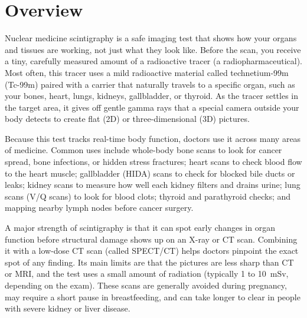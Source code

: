 \label{ch:infographic-nms}

\section{Overview}

Nuclear medicine scintigraphy is a safe imaging test that shows how your organs and tissues are working, not just what they look like. Before the scan, you receive a tiny, carefully measured amount of a radioactive tracer (a radiopharmaceutical). Most often, this tracer uses a mild radioactive material called technetium-99m (Tc-99m) paired with a carrier that naturally travels to a specific organ, such as your bones, heart, lungs, kidneys, gallbladder, or thyroid. As the tracer settles in the target area, it gives off gentle gamma rays that a special camera outside your body detects to create flat (2D) or three-dimensional (3D) pictures.

Because this test tracks real-time body function, doctors use it across many areas of medicine. Common uses include whole-body bone scans to look for cancer spread, bone infections, or hidden stress fractures; heart scans to check blood flow to the heart muscle; gallbladder (HIDA) scans to check for blocked bile ducts or leaks; kidney scans to measure how well each kidney filters and drains urine; lung scans (V/Q scans) to look for blood clots; thyroid and parathyroid checks; and mapping nearby lymph nodes before cancer surgery.

A major strength of scintigraphy is that it can spot early changes in organ function before structural damage shows up on an X-ray or CT scan. Combining it with a low-dose CT scan (called SPECT/CT) helps doctors pinpoint the exact spot of any finding. Its main limits are that the pictures are less sharp than CT or MRI, and the test uses a small amount of radiation (typically 1 to 10~mSv, depending on the exam). These scans are generally avoided during pregnancy, may require a short pause in breastfeeding, and can take longer to clear in people with severe kidney or liver disease.

